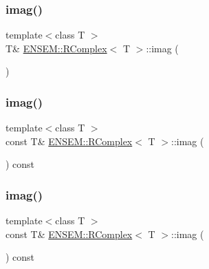 \mbox{\label{classENSEM_1_1RComplex_af4f97cf18c025407a8e66f848252243d}} 
\subsubsection{\texorpdfstring{imag()}{imag()}\hspace{0.1cm}{\footnotesize\ttfamily [3/6]}}
{\footnotesize\ttfamily template$<$class T $>$ \\
T\& \mbox{\hyperlink{classENSEM_1_1RComplex}{E\+N\+S\+E\+M\+::\+R\+Complex}}$<$ T $>$\+::imag (\begin{DoxyParamCaption}{ }\end{DoxyParamCaption})\hspace{0.3cm}{\ttfamily [inline]}}

\mbox{\label{classENSEM_1_1RComplex_a8df643a2ba06dc851d19eb35cd4c4cde}} 
\subsubsection{\texorpdfstring{imag()}{imag()}\hspace{0.1cm}{\footnotesize\ttfamily [4/6]}}
{\footnotesize\ttfamily template$<$class T $>$ \\
const T\& \mbox{\hyperlink{classENSEM_1_1RComplex}{E\+N\+S\+E\+M\+::\+R\+Complex}}$<$ T $>$\+::imag (\begin{DoxyParamCaption}{ }\end{DoxyParamCaption}) const\hspace{0.3cm}{\ttfamily [inline]}}

\mbox{\label{classENSEM_1_1RComplex_a8df643a2ba06dc851d19eb35cd4c4cde}} 
\subsubsection{\texorpdfstring{imag()}{imag()}\hspace{0.1cm}{\footnotesize\ttfamily [5/6]}}
{\footnotesize\ttfamily template$<$class T $>$ \\
const T\& \mbox{\hyperlink{classENSEM_1_1RComplex}{E\+N\+S\+E\+M\+::\+R\+Complex}}$<$ T $>$\+::imag (\begin{DoxyParamCaption}{ }\end{DoxyParamCaption}) const\hspace{0.3cm}{\ttfamily [inline]}}

